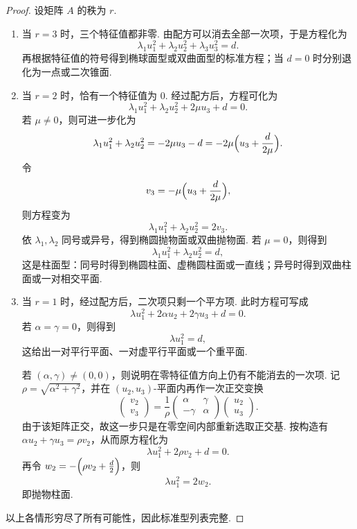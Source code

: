 \begin{proof}
    设矩阵 $A$ 的秩为 $r$.

    \begin{enumerate}
        \item 当 $r = 3$ 时，三个特征值都非零. 由配方可以消去全部一次项，于是方程化为
        \[
            \lambda_1 u_1^2 + \lambda_2 u_2^2 + \lambda_3 u_3^2 = d.
        \]
        再根据特征值的符号得到椭球面型或双曲面型的标准方程；当 $d = 0$ 时分别退化为一点或二次锥面.

        \item 当 $r = 2$ 时，恰有一个特征值为 $0$. 经过配方后，方程可化为
        \[
            \lambda_1 u_1^2 + \lambda_2 u_2^2 + 2 \mu u_3 + d = 0.
        \]
        若 $\mu \neq 0$，则可进一步化为
        \[
            \lambda_1 u_1^2 + \lambda_2 u_2^2 = - 2 \mu u_3 - d = - 2 \mu \Bigl(u_3 + \frac{d}{2 \mu}\Bigr).
        \]
        令
        \[
            v_3 = - \mu \Bigl(u_3 + \frac{d}{2 \mu}\Bigr),
        \]
        则方程变为
        \[
            \lambda_1 u_1^2 + \lambda_2 u_2^2 = 2 v_3.
        \]
        依 $\lambda_1, \lambda_2$ 同号或异号，得到椭圆抛物面或双曲抛物面. 若 $\mu = 0$，则得到
        \[
            \lambda_1 u_1^2 + \lambda_2 u_2^2 = d,
        \]
        这是柱面型：同号时得到椭圆柱面、虚椭圆柱面或一直线；异号时得到双曲柱面或一对相交平面.

        \item 当 $r = 1$ 时，经过配方后，二次项只剩一个平方项. 此时方程可写成
        \[
            \lambda u_1^2 + 2 \alpha u_2 + 2 \gamma u_3 + d = 0.
        \]
        若 $\alpha = \gamma = 0$，则得到
        \[
            \lambda u_1^2 = d,
        \]
        这给出一对平行平面、一对虚平行平面或一个重平面.

        若 $(\alpha,\gamma) \neq (0,0)$，则说明在零特征值方向上仍有不能消去的一次项. 记 $\rho = \sqrt{\alpha^2 + \gamma^2}$，并在 $(u_2,u_3)$-平面内再作一次正交变换
        \[
            \begin{pmatrix}
                v_2 \\
                v_3
            \end{pmatrix}
            =
            \frac{1}{\rho}
            \begin{pmatrix}
                \alpha & \gamma \\
                -\gamma & \alpha
            \end{pmatrix}
            \begin{pmatrix}
                u_2 \\
                u_3
            \end{pmatrix}.
        \]
        由于该矩阵正交，故这一步只是在零空间内部重新选取正交基. 按构造有 $\alpha u_2 + \gamma u_3 = \rho v_2$，从而原方程化为
        \[
            \lambda u_1^2 + 2 \rho v_2 + d = 0.
        \]
        再令 $w_2 = - \Bigl(\rho v_2 + \frac{d}{2}\Bigr)$，则
        \[
            \lambda u_1^2 = 2 w_2.
        \]
        即抛物柱面.
    \end{enumerate}

    以上各情形穷尽了所有可能性，因此标准型列表完整.
\end{proof}

